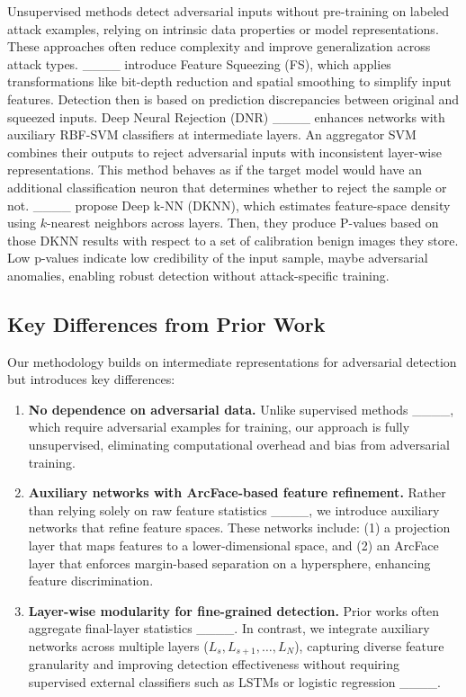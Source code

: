 Unsupervised methods detect adversarial inputs without pre-training on labeled attack examples, relying on intrinsic data properties or model representations. These approaches often reduce complexity and improve generalization across attack types. ____ introduce Feature Squeezing (FS), which applies transformations like bit-depth reduction and spatial smoothing to simplify input features. Detection then is based on prediction discrepancies between original and squeezed inputs. Deep Neural Rejection (DNR) ____ enhances networks with auxiliary RBF-SVM classifiers at intermediate layers. An aggregator SVM combines their outputs to reject adversarial inputs with inconsistent layer-wise representations. This method behaves as if the target model would have an additional classification neuron that determines whether to reject the sample or not. ____ propose Deep k-NN (DKNN), which estimates feature-space density using $k$-nearest neighbors across layers. Then, they produce P-values based on those DKNN results with respect to a set of calibration benign images they store. Low p-values indicate low credibility of the input sample, maybe adversarial anomalies, enabling robust detection without attack-specific training.

\subsection{Key Differences from Prior Work}
Our methodology builds on intermediate representations for adversarial detection but introduces key differences:
\begin{enumerate}
    \item \textbf{No dependence on adversarial data.} Unlike supervised methods ____, which require adversarial examples for training, our approach is fully unsupervised, eliminating computational overhead and bias from adversarial training.
    \item \textbf{Auxiliary networks with ArcFace-based feature refinement.} Rather than relying solely on raw feature statistics ____, we introduce auxiliary networks that refine feature spaces. These networks include: (1) a projection layer that maps features to a lower-dimensional space, and (2) an ArcFace layer that enforces margin-based separation on a hypersphere, enhancing feature discrimination.
    \item \textbf{Layer-wise modularity for fine-grained detection.} Prior works often aggregate final-layer statistics ____. In contrast, we integrate auxiliary networks across multiple layers ($L_{s}, L_{s+1}, \dots, L_{N}$), capturing diverse feature granularity and improving detection effectiveness without requiring supervised external classifiers such as LSTMs or logistic regression ____.
\end{enumerate}